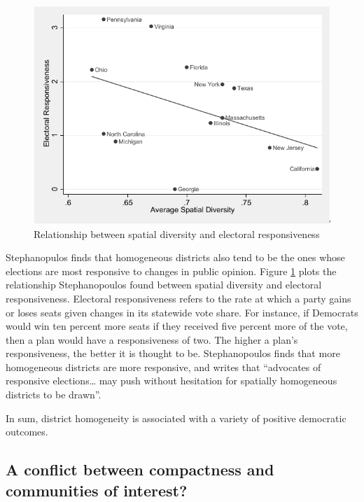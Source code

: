 \documentclass[]{article}
\begin{document}
\begin{figure}
\centering
\includegraphics{./img/average_spatial-diversity.png}
\caption{Relationship between spatial diversity and electoral
responsiveness\label{sd_responsiveness}}
\end{figure}

Stephanopulos finds that homogeneous districts also tend to be the ones
whose elections are most responsive to changes in public opinion. Figure
\ref{sd_responsiveness} plots the relationship Stephanopoulos found
between spatial diversity and electoral responsiveness. Electoral
responsiveness refers to the rate at which a party gains or loses seats
given changes in its statewide vote share. For instance, if Democrats
would win ten percent more seats if they received five percent more of
the vote, then a plan would have a responsiveness of two. The higher a
plan's responsiveness, the better it is thought to be. Stephanopoulos
finds that more homogeneous districts are more responsive, and writes
that ``advocates of responsive elections\ldots{} may push without
hesitation for spatially homogeneous districts to be drawn''.

In sum, district homogeneity is associated with a variety of positive
democratic outcomes.

\hypertarget{a-conflict-between-compactness-and-communities-of-interest}{%
\subsection{A conflict between compactness and communities of
interest?}\label{a-conflict-between-compactness-and-communities-of-interest}}
\end{document}
